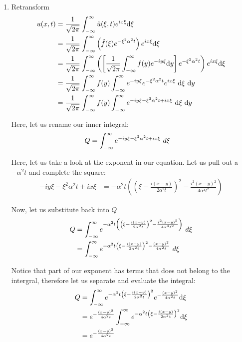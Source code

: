 \begin{enumerate}
  \item Retransform
  \begin{align}
    u(x, t) & = \frac{1}{\sqrt{2 \pi}} \int^\infty_{-\infty} \hat u(\xi, t) e^{i x \xi} \text d\xi\\
    & = \frac{1}{\sqrt{2 \pi}} \int^\infty_{-\infty}
    \left( \hat f(\xi) e^{-\xi^2 \alpha^2 t} \right)e^{i x \xi} \text d\xi\\
    & = \frac{1}{\sqrt{2 \pi}} \int^\infty_{-\infty}
    \left(
    \left[ \frac{1}{\sqrt{2 \pi}} \int^\infty_{-\infty} f(y) e^{-i y \xi} \text dy \right]
     e^{-\xi^2 \alpha^2 t} \right)e^{i x \xi} \text d\xi\\
    & = \frac{1}{\sqrt{2 \pi}} \int^\infty_{-\infty} f(y)
    \int^\infty_{-\infty} e^{-i y \xi} e^{-\xi^2 \alpha^2 t} e^{i x \xi} \ \text d\xi \ \text dy\\
   & = \frac{1}{\sqrt{2 \pi}} \int^\infty_{-\infty} f(y)
   \int^\infty_{-\infty} e^{-i y \xi - \xi^2 \alpha^2 t + i x \xi}
   \ \text d\xi \ \text dy
  \end{align}

  Here, let us rename our inner integral:
  \begin{align}
    Q & = \int^\infty_{-\infty} e^{-i y \xi - \xi^2 \alpha^2 t + i x \xi} \text \ d\xi
  \end{align}

  Here, let us take a look at the exponent in our equation. Let us pull out a $-\alpha^2 t$ and complete the square:
  \begin{align}
    -i y \xi - \xi^2 \alpha^2 t + i x \xi & = -\alpha^2 t
    \left(
    \left( \xi - \frac{i(x - y)}{2\alpha^2 t} \right)^2 - \frac{i^2 (x - y)^2}{4 \alpha^4 t^2}
     \right)
  \end{align}

  Now, let us substitute back into $Q$
  \begin{align}
    Q & = \int^\infty_{-\infty} e^
    {-\alpha^2 t
    \left(
    \left( \xi - \frac{i(x - y)}{2\alpha^2 t} \right)^2 - \frac{i^2 (x - y)^2}{4 \alpha^4 t^2}
     \right)}
    \text \ d\xi\\
    & = \int^\infty_{-\infty} e^
    {
    -\alpha^2 t
    \left( \xi - \frac{i(x - y)}{2\alpha^2 t} \right)^2 - \frac{(x - y)^2}{4 \alpha^2 t}
    }
    \text \ d\xi
  \end{align}

  Notice that part of our exponent has terms that does not belong to the intergral, therefore let us separate and evaluate the integral:
  \begin{align}
    Q & =
    \int^{\infty}_{-\infty}
    e^{-\alpha^2 t \left( \xi - \frac{i(x - y)}{2\alpha^2t} \right)^2}
    e^{-\frac{(x - y)^2}{4 \alpha^2 t}} \text d\xi\\
    & =
    e^{-\frac{(x - y)^2}{4 \alpha^2 t}}
    \int^{\infty}_{-\infty}
    e^{-\alpha^2 t \left( \xi - \frac{i(x - y)}{2\alpha^2t} \right)^2} \text d\xi\\
    & =
    e^{-\frac{(x - y)^2}{4 \alpha^2 t}}
  \end{align}


\end{enumerate}
